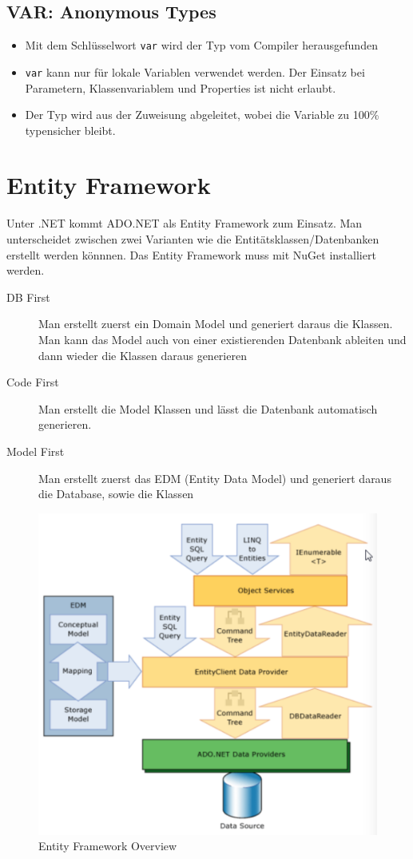 \documentclass[
a4paper,
oneside,
10pt,
fleqn,
headsepline,
toc=listofnumbered, 
bibliography=totocnumbered]{scrartcl}
\let\stdsection\section
\renewcommand\section{\clearpage\stdsection}
\begin{document}
\subsection{VAR: Anonymous Types}
\begin{itemize}
	\item Mit dem Schlüsselwort \lstinline|var| wird der Typ vom Compiler herausgefunden
	\item \lstinline|var| kann nur für lokale Variablen verwendet werden. Der Einsatz bei Parametern, Klassenvariablem und Properties ist nicht erlaubt.
	\item Der Typ wird aus der Zuweisung abgeleitet, wobei die Variable zu 100\% typensicher bleibt.
\end{itemize}

\section{Entity Framework}

Unter .NET kommt ADO.NET als Entity Framework zum Einsatz. Man unterscheidet zwischen zwei Varianten wie die Entitätsklassen/Datenbanken erstellt werden könnnen. Das Entity Framework muss mit NuGet installiert werden.
\begin{description}
	\item[DB First] Man erstellt zuerst ein Domain Model und generiert daraus die Klassen. Man kann das Model auch von einer existierenden Datenbank ableiten und dann wieder die Klassen daraus generieren
	\item[Code First] Man erstellt die Model Klassen und lässt die Datenbank automatisch generieren.
	\item[Model First] Man erstellt zuerst das EDM (Entity Data Model) und generiert daraus die Database, sowie die Klassen
\end{description}

\begin{figure}[h]
	\centering
	\includegraphics[width=0.7\linewidth]{images/entitiy_framework}
	\caption{Entity Framework Overview}
	\label{fig:entitydatamodel}
\end{figure}
\end{document}
